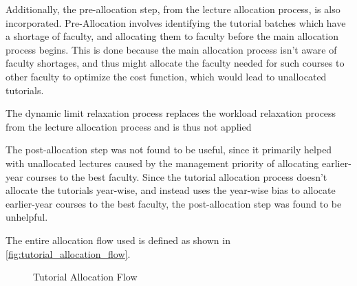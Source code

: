 Additionally, the pre-allocation step, from the lecture allocation process, is also incorporated. Pre-Allocation involves identifying the tutorial batches which have a shortage of faculty, and allocating them to faculty before the main allocation process begins. This is done because the main allocation process isn't aware of faculty shortages, and thus might allocate the faculty needed for such courses to other faculty to optimize the cost function, which would lead to unallocated tutorials.

The dynamic limit relaxation process replaces the workload relaxation process from the lecture allocation process and is thus not applied

The post-allocation step was not found to be useful, since it primarily helped with unallocated lectures caused by the management priority of allocating earlier-year courses to the best faculty. Since the tutorial allocation process doesn't allocate the tutorials year-wise, and instead uses the year-wise bias to allocate earlier-year courses to the best faculty, the post-allocation step was found to be unhelpful.

The entire allocation flow used is defined as shown in \autoref{fig:tutorial_allocation_flow}.

\begin{figure}[H]
  \centering
  \caption{Tutorial Allocation Flow}
  \label{fig:tutorial_allocation_flow}
\end{figure}

